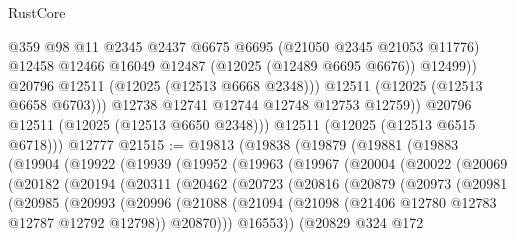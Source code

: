 \begin{lexlean}{RustCore}
\begin{coremodule}
                    @359
                    @98
                    @11
                    @2345
                    @2437
                    @6675
                    @6695
                    (@21050 @2345 @21053 @11776)
                    @12458
                    @12466
                    @16049
                    @12487
                    (@12025 (@12489 @6695 @6676))
                    @12499))
                @20796
                @12511
                (@12025 (@12513 @6668 @2348)))
              @12511
              (@12025 (@12513 @6658 @6703)))
            @12738
            @12741
            @12744
            @12748
            @12753
            @12759))
        @20796
        @12511
        (@12025 (@12513 @6650 @2348)))
      @12511
      (@12025 (@12513 @6515 @6718)))
    @12777
@21515 := @19813
    (@19838
      (@19879
        (@19881
          (@19883
            (@19904
              (@19922
                (@19939
                  (@19952
                    (@19963
                      (@19967
                        (@20004
                          (@20022
                            (@20069
                              (@20182
                                (@20194
                                  (@20311
                                    (@20462
                                      (@20723
                                        (@20816
                                          (@20879
                                            (@20973
                                              (@20981
                                                (@20985
                                                  (@20993
                                                    (@20996
                                                      (@21088
                                                        (@21094
                                                          (@21098
                                                            (@21406
                                                              @12780
                                                              @12783
                                                              @12787
                                                              @12792
                                                              @12798))
                                                          @20870)))
                                                    @16553))
                                                (@20829
                                                  @324
                                                  @172

\end{coremodule}
\end{lexlean}
